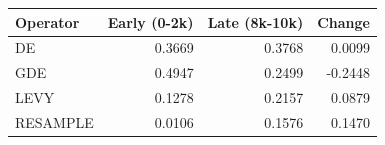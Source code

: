 \begin{tabular}{lrrr}
\toprule
Operator & Early (0-2k) & Late (8k-10k) & Change \\
\midrule
DE & 0.3669 & 0.3768 & 0.0099 \\
GDE & 0.4947 & 0.2499 & -0.2448 \\
LEVY & 0.1278 & 0.2157 & 0.0879 \\
RESAMPLE & 0.0106 & 0.1576 & 0.1470 \\
\bottomrule
\end{tabular}
